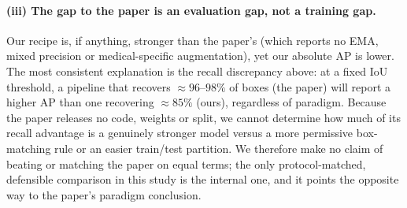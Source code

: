 \documentclass[11pt,a4paper]{article}
\begin{document}
\paragraph{(iii) The gap to the paper is an evaluation gap, not a training gap.}
Our recipe is, if anything, stronger than the paper's (which reports no EMA, mixed precision or medical-specific augmentation), yet our absolute AP is lower. The most consistent explanation is the recall discrepancy above: at a fixed IoU threshold, a pipeline that recovers $\approx 96$--$98\%$ of boxes (the paper) will report a higher AP than one recovering $\approx 85\%$ (ours), regardless of paradigm. Because the paper releases no code, weights or split, we cannot determine how much of its recall advantage is a genuinely stronger model versus a more permissive box-matching rule or an easier train/test partition. We therefore make no claim of beating or matching the paper on equal terms; the only protocol-matched, defensible comparison in this study is the internal one, and it points the opposite way to the paper's paradigm conclusion.
\pagebreak
\end{document}
